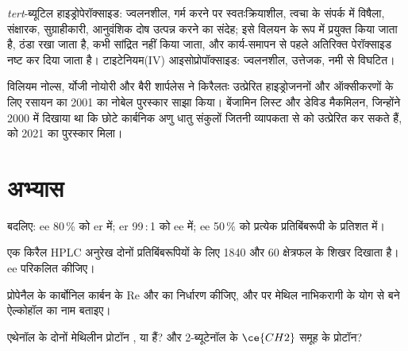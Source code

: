 \begin{safety}{}
\textit{tert}-ब्यूटिल हाइड्रोपेरॉक्साइड: ज्वलनशील, गर्म करने पर स्वतःक्रियाशील, त्वचा के संपर्क में
विषैला, संक्षारक, सुग्राहीकारी, आनुवंशिक दोष उत्पन्न करने का संदेह; इसे
विलयन के रूप में प्रयुक्त किया जाता है, ठंडा रखा जाता है, कभी सांद्रित नहीं किया जाता, और कार्य-समापन से पहले
अतिरिक्त पेरॉक्साइड नष्ट कर दिया जाता है। टाइटेनियम(IV) आइसोप्रोपॉक्साइड: ज्वलनशील, उत्तेजक,
नमी से विघटित।
\end{safety}

\begin{history}[असममित उत्प्रेरण के लिए दो पुरस्कार]
विलियम नोल्स, र्योजी नोयोरी और बैरी शार्पलेस ने किरैलतः उत्प्रेरित हाइड्रोजननों और ऑक्सीकरणों के लिए
रसायन का 2001 का नोबेल पुरस्कार साझा किया। बेंजामिन लिस्ट
और डेविड मैकमिलन, जिन्होंने 2000 में दिखाया था कि छोटे कार्बनिक अणु
धातु संकुलों जितनी व्यापकता से  को उत्प्रेरित कर सकते हैं, को
2021 का पुरस्कार मिला।
\end{history}

\section{अभ्यास}

\begin{exercise}[$\star$]\label{exo:b3:asymmetric-synthesis:1}
बदलिए: ee 80\,\% को er में; er 99\,:\,1 को ee में; ee 50\,\% को प्रत्येक
प्रतिबिंबरूपी के प्रतिशत में।
\end{exercise}

\begin{exercise}[$\star$]\label{exo:b3:asymmetric-synthesis:2}
एक किरैल HPLC अनुरेख दोनों प्रतिबिंबरूपियों के लिए 1840 और 60 क्षेत्रफल के शिखर दिखाता है।
ee परिकलित कीजिए।
\end{exercise}

\begin{exercise}[$\star$]\label{exo:b3:asymmetric-synthesis:3}
प्रोपेनैल के कार्बोनिल कार्बन के Re और  का निर्धारण कीजिए, और  पर मेथिल नाभिकरागी के
योग से बने ऐल्कोहॉल का नाम बताइए।
\end{exercise}

\begin{exercise}[$\star$]\label{exo:b3:asymmetric-synthesis:4}
एथेनॉल के दोनों मेथिलीन प्रोटॉन ,  या  हैं?
और 2-ब्यूटेनॉल के $\ce{CH2}$ समूह के प्रोटॉन?
\end{exercise}

